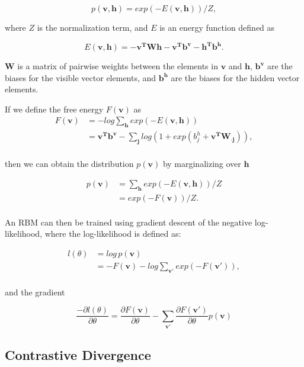 \documentclass{article}
\begin{document}
\[
  p \left( \mathbf{v}, \mathbf{h} \right) = 
  exp \left(-E \left( \mathbf{v}, \mathbf{h} \right) \right) / Z,
\]

where $Z$ is the normalization term, and $E$ is an energy function defined as

\[
  E \left( \mathbf{v}, \mathbf{h} \right) = 
  - \mathbf{v^TWh} - \mathbf{v^Tb^v} - \mathbf{h^Tb^h}.
\]

$\mathbf{W}$ is a matrix of pairwise weights between the elements in 
$\mathbf{v}$ and $\mathbf{h}$, $\mathbf{b^v}$ are the biases for the visible
vector elements, and $\mathbf{b^h}$ are the biases for the hidden vector
elements.

If we define the free energy $F(\mathbf{v})$ as
\begin{align*}
  F \left( \mathbf{v} \right) &= -log \sum_{\mathbf{h}} exp \left( -E \left( \mathbf{v,h} \right) \right) \\
  &= \mathbf{v^Tb^v} - \sum_{\mathbf{j}} log
    \left(
      1 + exp \left( b_j^h + \mathbf{v^TW_{\cdot j}} \right)
    \right), \\
\end{align*}

then we can obtain the distribution $p(\mathbf{v})$ by marginalizing over
$\mathbf{h}$

\begin{align*}
  p(\mathbf{v}) &= \sum_{\mathbf{h}} exp(-E(\mathbf{v, h})) / Z \\
                &= exp(-F(\mathbf{v})) / Z. \\
\end{align*}

An RBM can then be trained using gradient descent of the negative
log-likelihood, where the log-likelihood is defined as:

\begin{align*}
  l(\theta) &= log \, p(\mathbf{v}) \\
            &= -F(\mathbf{v}) - log \sum_{\mathbf{v'}} exp (-F(\mathbf{v'})), \\
\end{align*}

and the gradient

\[
  \frac{- \partial l(\theta)}{\partial \theta}
  = \frac{\partial F(\mathbf{v})}{\partial \theta} - 
  \sum_{\mathbf{v'}}\frac{\partial F(\mathbf{v'})}{\partial \theta}
                  p(\mathbf{v})
\]

\subsection{Contrastive Divergence}
\end{document}
